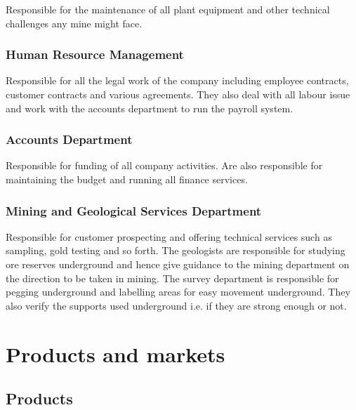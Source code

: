 \noindent Responsible for the maintenance of all plant equipment and other technical challenges any mine might face. \par


\subsubsection{ Human Resource Management}

\noindent Responsible for all the legal work of the company including employee contracts, customer contracts and various agreements. They also deal with all labour issue and work with the accounts department to run the payroll system. \par


\subsubsection{ Accounts Department}

\noindent Responsible for funding of all company activities. Are also responsible for maintaining the budget and running all finance services. \par


\subsubsection{ Mining and Geological Services Department}

\noindent Responsible for customer prospecting and offering technical services such as sampling, gold testing and so forth. The geologists are responsible for studying ore reserves underground and hence give guidance to the mining department on the direction to be taken in mining. The survey department is responsible for pegging underground and labelling areas for easy movement underground. They also verify the supports used underground i.e. if they are strong enough or not.\par


\section{ Products and markets}


\subsection{ Products}

